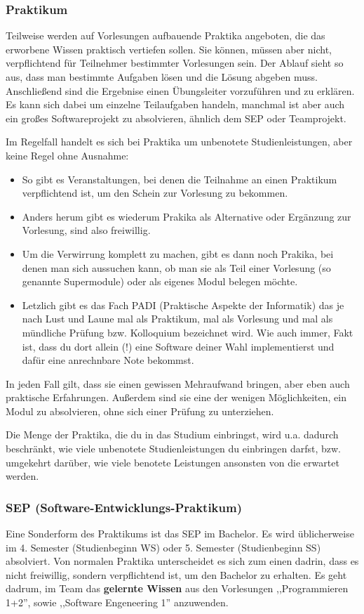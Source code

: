 \subsubsection*{Praktikum}
Teilweise werden auf Vorlesungen aufbauende Praktika angeboten, die
das erworbene Wissen praktisch vertiefen sollen. Sie können, müssen aber nicht,
verpflichtend für Teilnehmer bestimmter Vorlesungen sein. Der Ablauf
sieht so aus, dass man bestimmte Aufgaben lösen und die Lösung abgeben
muss. Anschließend sind die Ergebnise einen Übungsleiter vorzuführen
und zu erklären. Es kann sich dabei um einzelne Teilaufgaben handeln,
manchmal ist aber auch ein großes Softwareprojekt zu absolvieren, ähnlich dem
SEP oder Teamprojekt. 

Im Regelfall handelt es sich bei Praktika um
unbenotete Studienleistungen, aber keine Regel ohne Ausnahme: 
\begin{itemize}
\item So gibt es Veranstaltungen, bei denen die Teilnahme an einen Praktikum
verpflichtend ist, um den Schein zur Vorlesung zu bekommen. 
\item Anders
herum gibt es wiederum Prakika als Alternative oder Ergänzung zur
Vorlesung, sind also freiwillig. 
\item Um die Verwirrung komplett zu machen,
gibt es dann noch Prakika, bei denen man sich aussuchen kann, ob man
sie als Teil einer Vorlesung (so genannte Supermodule) oder als eigenes Modul belegen möchte.
\item Letzlich gibt es das Fach PADI (Praktische Aspekte der 
Informatik) das je nach Lust und Laune mal als Praktikum, mal 
als Vorlesung und mal als mündliche Prüfung bzw. Kolloquium bezeichnet 
wird. Wie auch immer, Fakt ist, dass du dort allein (!) eine Software deiner Wahl 
implementierst und dafür eine anrechnbare Note bekommst.
\end{itemize}
In jeden Fall gilt, dass sie einen gewissen Mehraufwand bringen, aber
eben auch praktische Erfahrungen. Außerdem sind sie eine der wenigen
Möglichkeiten, ein Modul zu absolvieren, ohne sich einer Prüfung zu
unterziehen.

Die Menge der Praktika, die du in das Studium einbringst, wird u.a. 
dadurch beschränkt, wie viele unbenotete Studienleistungen du einbringen 
darfst, bzw. umgekehrt darüber, wie viele benotete Leistungen ansonsten 
von die erwartet werden.

\subsubsection*{SEP (Software-Entwicklungs-Praktikum)}
Eine Sonderform des Praktikums ist das SEP im Bachelor. Es wird
üblicherweise im 4. Semester (Studienbeginn WS) oder 5. Semester
(Studienbeginn SS) absolviert. Von normalen Praktika
unterscheidet es sich zum einen dadrin, dass es nicht freiwillig,
sondern verpflichtend ist, um den Bachelor zu erhalten. Es geht
dadrum, im Team das \textbf{gelernte Wissen} aus den Vorlesungen
,,Programmieren 1+2'', sowie ,,Software Engeneering 1''
anzuwenden. %

